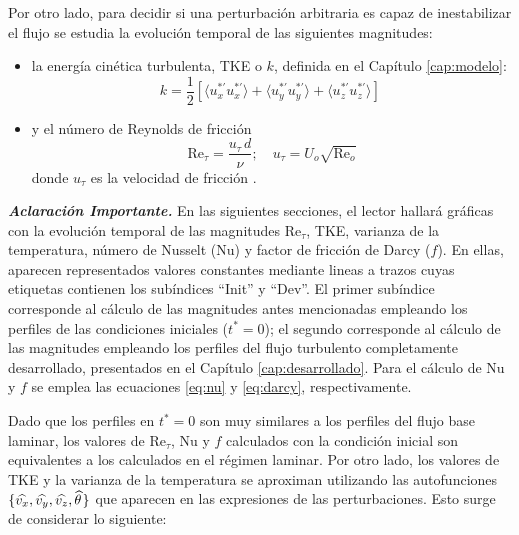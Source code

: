 Por otro lado, para decidir si una perturbación arbitraria es capaz de inestabilizar el flujo se estudia la evolución temporal de las siguientes magnitudes:

\begin{itemize}
  \item la energía cinética turbulenta, TKE o $k$, definida en el Capítulo \ref{cap:modelo}: 
  	\begin{equation*}
  		k = \frac{1}{2} \left[ \langle u^{* \prime}_x u^{* \prime}_x \rangle + \langle u^{* \prime}_y u^{* \prime}_y \rangle + \langle u^{* \prime}_z u^{* \prime}_z \rangle \right] \ 
  	\end{equation*}
  	
  

  \item y el número de Reynolds de fricción
        $$
          \text{Re}_{\tau} = \frac{u_{\tau}\,d}{\nu} ; \quad u_{\tau}= U_o \sqrt{\text{Re}_o}
        $$
        donde $u_{\tau}$ es la velocidad de fricción \cite{pope2001turbulent}.
\end{itemize}

\begin{table}[H]
\centering
{}
\caption{Parámetros adimensionales de los dos casos elegidos.}
\label{tab:cases}
\end{table}

\textit{\textbf{Aclaración Importante.}} En las siguientes secciones, el lector hallará gráficas con la evolución temporal de las magnitudes  Re$_{\tau}$, TKE, varianza de la temperatura, número de Nusselt (Nu) y factor de fricción de Darcy ($f$). En ellas, aparecen representados valores constantes mediante lineas a trazos cuyas etiquetas contienen los subíndices ``Init'' y ``Dev''. El primer subíndice corresponde al cálculo de las magnitudes antes mencionadas empleando los perfiles de las condiciones iniciales ($t^*=0$); el segundo corresponde al cálculo de las magnitudes empleando los perfiles del flujo turbulento completamente desarrollado, presentados en el Capítulo \ref{cap:desarrollado}. Para el cálculo de Nu y $f$ se emplea las ecuaciones \ref{eq:nu} y \ref{eq:darcy}, respectivamente.

Dado que los perfiles en $t^*=0$ son muy similares a los perfiles del flujo base laminar, los valores de Re$_{\tau}$, Nu y $f$ calculados con la condición inicial son equivalentes a los calculados en el régimen laminar. Por otro lado, los valores de TKE y la varianza de la temperatura se aproximan utilizando las autofunciones $\lbrace \widehat{v_x}, \widehat{v_y}, \widehat{v_z}, \widehat{\theta} \hspace{0.3mm} \rbrace$ que aparecen en las expresiones de las perturbaciones. Esto surge de considerar lo siguiente: 

